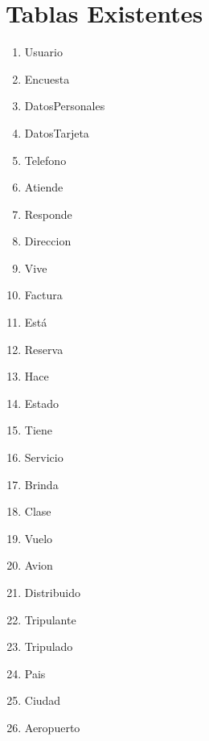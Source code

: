 \section{Tablas Existentes}

\begin{enumerate}    
    \item{Usuario} %
    \item{Encuesta} %
    \item{DatosPersonales} %
    \item{DatosTarjeta} %
    \item{Telefono} %
    \item{Atiende} %
    \item{Responde} %
    \item{Direccion} %
    \item{Vive} %
    \item{Factura} %
    \item{Está} %
    \item{Reserva} %
    \item{Hace} %
    \item{Estado} %
    \item{Tiene} %
    \item{Servicio} %
    \item{Brinda} %
    \item{Clase} %
    \item{Vuelo} %
    \item{Avion} %
    \item{Distribuido} %
    \item{Tripulante} %
    \item{Tripulado} %
    \item{Pais} %
    \item{Ciudad} %
    \item{Aeropuerto} %
\end{enumerate}